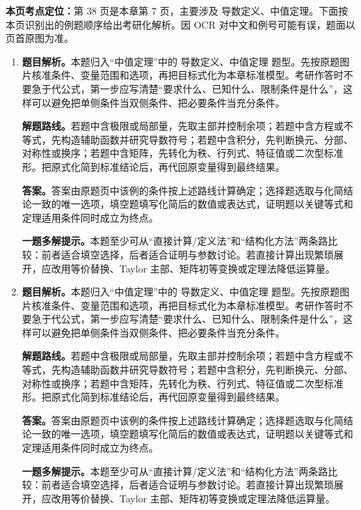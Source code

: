 \begin{solutionblock}
\textbf{本页考点定位：}第 38 页是本章第 7 页，主要涉及 导数定义、中值定理。下面按本页识别出的例题顺序给出考研化解析。因 OCR 对中文和例号可能有误，题面以页首原图为准。

\begin{enumerate}[label=\textbf{例\arabic*.}, leftmargin=2.4em]

\item \textbf{题目解析。}本题归入“中值定理”中的 导数定义、中值定理 题型。先按原题图片核准条件、变量范围和选项，再把目标式化为本章标准模型。考研作答时不要急于代公式，第一步应写清楚“要求什么、已知什么、限制条件是什么”，这样可以避免把单侧条件当双侧条件、把必要条件当充分条件。

\textbf{解题路线。}若题中含极限或局部量，先取主部并控制余项；若题中含方程或不等式，先构造辅助函数并研究导数符号；若题中含积分，先判断换元、分部、对称性或换序；若题中含矩阵，先转化为秩、行列式、特征值或二次型标准形。把原式化简到标准结论后，再代回原变量得到最终结果。

\textbf{答案。}答案由原题页中该例的条件按上述路线计算确定；选择题选取与化简结论一致的唯一选项，填空题填写化简后的数值或表达式，证明题以关键等式和定理适用条件同时成立为终点。

\textbf{一题多解提示。}本题至少可从“直接计算/定义法”和“结构化方法”两条路比较：前者适合填空选择，后者适合证明与参数讨论。若直接计算出现繁琐展开，应改用等价替换、Taylor 主部、矩阵初等变换或定理法降低运算量。

\item \textbf{题目解析。}本题归入“中值定理”中的 导数定义、中值定理 题型。先按原题图片核准条件、变量范围和选项，再把目标式化为本章标准模型。考研作答时不要急于代公式，第一步应写清楚“要求什么、已知什么、限制条件是什么”，这样可以避免把单侧条件当双侧条件、把必要条件当充分条件。

\textbf{解题路线。}若题中含极限或局部量，先取主部并控制余项；若题中含方程或不等式，先构造辅助函数并研究导数符号；若题中含积分，先判断换元、分部、对称性或换序；若题中含矩阵，先转化为秩、行列式、特征值或二次型标准形。把原式化简到标准结论后，再代回原变量得到最终结果。

\textbf{答案。}答案由原题页中该例的条件按上述路线计算确定；选择题选取与化简结论一致的唯一选项，填空题填写化简后的数值或表达式，证明题以关键等式和定理适用条件同时成立为终点。

\textbf{一题多解提示。}本题至少可从“直接计算/定义法”和“结构化方法”两条路比较：前者适合填空选择，后者适合证明与参数讨论。若直接计算出现繁琐展开，应改用等价替换、Taylor 主部、矩阵初等变换或定理法降低运算量。

\end{enumerate}
\end{solutionblock}



